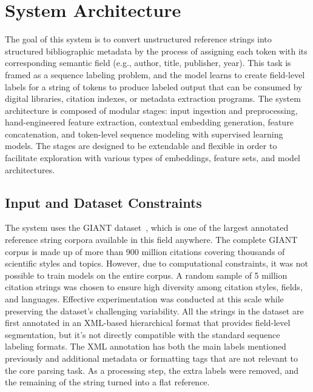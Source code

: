 \section{System Architecture}
The goal of this system is to convert unstructured reference strings into structured bibliographic metadata by the process of assigning each token with its corresponding semantic field (e.g., author, title, publisher, year). This task is framed as a sequence labeling problem, and the model learns to create field-level labels for a string of tokens to produce labeled output that can be consumed by digital libraries, citation indexes, or metadata extraction programs.
The system architecture is composed of modular stages: input ingestion and preprocessing, hand-engineered feature extraction, contextual embedding generation, feature concatenation, and token-level sequence modeling with supervised learning models. The stages are designed to be extendable and flexible in order to facilitate exploration with various types of embeddings, feature sets, and model architectures.

\subsection{Input and Dataset Constraints}
The system uses the GIANT dataset~\cite{giant}, which is one of the largest annotated reference string corpora available in this field anywhere. The complete GIANT corpus is made up of more than 900 million citations covering thousands of scientific styles and topics. However, due to computational constraints, it was not possible to train models on the entire corpus. A random sample of 5 million citation strings was chosen to ensure high diversity among citation styles, fields, and languages. Effective experimentation was conducted at this scale while preserving the dataset’s challenging variability.
All the strings in the dataset are first annotated in an XML-based hierarchical format that provides field-level segmentation, but it’s not directly compatible with the standard sequence labeling formats. The XML annotation has both the main labels mentioned previously and additional metadata or formatting tags that are not relevant to the core parsing task. As a processing step, the extra labels were removed, and the remaining of the string turned into a flat reference.


